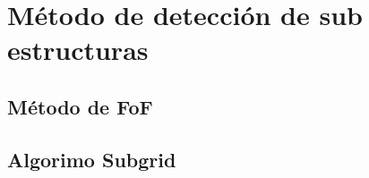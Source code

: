 \section{Método de detección de sub estructuras}
\label{sec: detección sub-estructuras}

    \subsection{Método de FoF}
    \label{subsec: FoF}


    \subsection{Algorimo Subgrid}
    \label{subsec: Algoritmo subgrid}


















